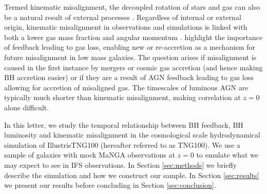 \documentclass[fleqn,usenatbib]{mnras}
\newcommand{\red}[1]{{\textcolor{red}{#1}}}
\begin{document}
Termed kinematic misalignment, the decoupled rotation of stars and gas can also be a natural result of external processes \cite[e.g.][]{davis2011, barrera2015, vdvoort2015, jin2016, bryant2019, duckworth2019_halo, li_decoupling2019}. Regardless of internal or external origin, kinematic misalignment in observations and simulations is linked with both a lower gas mass fraction and angular momentum \citep[][]{starkenburg+19, duckworth2020, khim2019}. \citet{starkenburg+19} highlight the importance of feedback leading to gas loss, enabling new or re-accretion as a mechanism for future misalignment in low mass galaxies. The question arises if misalignment is caused in the first instance by mergers or cosmic gas accretion (and hence making BH accretion easier) or if they are a result of AGN feedback leading to gas loss allowing for accretion of misaligned gas.
The timescales of luminous AGN are typically much shorter than kinematic misalignment, making correlation at $z=0$ alone difficult. 

In this letter, we study the temporal relationship between BH feedback, BH luminosity and kinematic misalignment in the cosmological scale hydrodynamical simulation of IllustrisTNG100 (hereafter referred to as TNG100). We use a sample of galaxies with mock MaNGA \citep[Mapping Galaxies at Apache Point;][]{bundy2015, blanton2017} observations at $z=0$ to emulate what we may expect to see in IFS observations. In Section \ref{sec:methods} we briefly describe the simulation and how we construct our sample. In Section \ref{sec:results} we present our results before concluding in Section \ref{sec:conclusion}.
\end{document}
